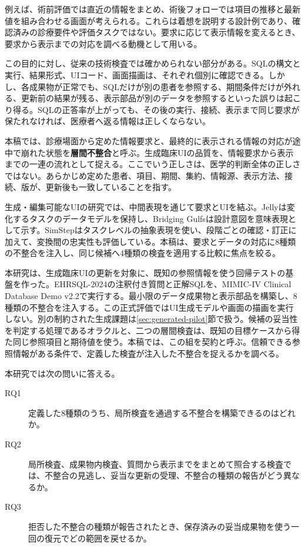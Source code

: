 \documentclass[manuscript,review,anonymous]{acmart}
\newcommand{\term}[1]{\textbf{#1}}
\begin{document}
例えば、術前評価では直近の情報をまとめ、術後フォローでは項目の推移と最新値を組み合わせる画面が考えられる。これらは着想を説明する設計例であり、確認済みの診療要件や評価タスクではない。要求に応じて表示情報を変えるとき、要求から表示までの対応を調べる動機として用いる。

この目的に対し、従来の技術検査では確かめられない部分がある。SQLの構文と実行、結果形式、UIコード、画面描画は、それぞれ個別に確認できる。しかし、各成果物が正常でも、SQLだけが別の患者を参照する、期間条件だけが外れる、更新前の結果が残る、表示部品が別のデータを参照するといった誤りは起こり得る。SQLの正答率が上がっても、その後の実行、接続、表示まで同じ要求が保たれなければ、医療者へ返る情報は正しくならない。

本稿では、診療場面から定めた情報要求と、最終的に表示される情報の対応が途中で崩れた状態を\term{層間不整合}と呼ぶ。生成臨床UIの品質を、情報要求から表示までの一連の流れとして捉える。ここでいう正しさは、医学的判断全体の正しさではない。あらかじめ定めた患者、項目、期間、集約、情報源、表示方法、接続、版が、更新後も一致していることを指す。

生成・編集可能なUIの研究では、中間表現を通じて要求とUIを結ぶ。Jellyは変化するタスクのデータモデルを保持し\cite{cao2025jelly}、Bridging Gulfsは設計意図を意味表現として示す\cite{park2026bridging}。SimStepはタスクレベルの抽象表現を使い、段階ごとの確認・訂正に加えて、変換間の忠実性も評価している\cite{kaputa2026simstep}。本稿は、要求とデータの対応に8種類の不整合を注入し、同じ候補へ4種類の検査を適用する比較に焦点を絞る。

本研究は、生成臨床UIの更新を対象に、既知の参照情報を使う回帰テストの基盤を作った。EHRSQL-2024の注釈付き質問と正解SQL\cite{lee2024ehrsql}を、MIMIC-IV Clinical Database Demo v2.2\cite{johnson2023mimic}で実行する。最小限のデータ成果物と表示部品を構築し、8種類の不整合を注入する。この正式評価ではUI生成モデルや画面の描画を実行しない。別の制約された生成課題は\ref{sec:generated-pilot}節で扱う。候補の妥当性を判定する処理であるオラクルと、二つの層間検査は、既知の目標ケースから得た同じ参照項目と期待値を使う。本稿では、この組を契約と呼ぶ。信頼できる参照情報がある条件で、定義した検査が注入した不整合を捉えるかを調べる。

本研究では次の問いに答える。

\begin{description}
  \item[RQ1] 定義した8種類のうち、局所検査を通過する不整合を構築できるのはどれか。
  \item[RQ2] 局所検査、成果物内検査、質問から表示までをまとめて照合する検査では、不整合の見逃し、妥当な更新の受理、不整合の種類の報告がどう異なるか。
  \item[RQ3] 拒否した不整合の種類が報告されたとき、保存済みの妥当成果物を使う一回の復元でどの範囲を戻せるか。
\end{description}
\end{document}
